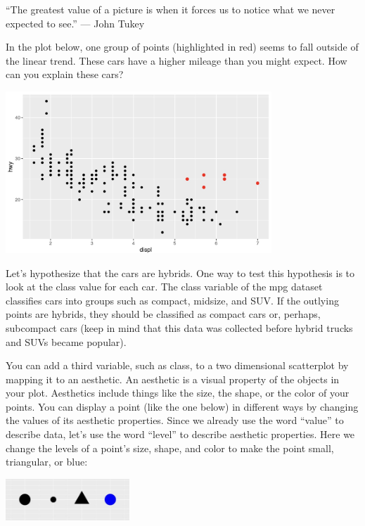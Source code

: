 \documentclass[
  letterpaper,
  DIV=11,
  numbers=noendperiod]{scrreprt}
\begin{document}

``The greatest value of a picture is when it forces us to notice what we
never expected to see.'' --- John Tukey

In the plot below, one group of points (highlighted in red) seems to
fall outside of the linear trend. These cars have a higher mileage than
you might expect. How can you explain these cars?

\includegraphics[width=0.75\textwidth,height=\textheight]{./images/Daily-2-Pic-3.jpg}

Let's hypothesize that the cars are hybrids. One way to test this
hypothesis is to look at the class value for each car. The class
variable of the mpg dataset classifies cars into groups such as compact,
midsize, and SUV. If the outlying points are hybrids, they should be
classified as compact cars or, perhaps, subcompact cars (keep in mind
that this data was collected before hybrid trucks and SUVs became
popular).

You can add a third variable, such as class, to a two dimensional
scatterplot by mapping it to an aesthetic. An aesthetic is a visual
property of the objects in your plot. Aesthetics include things like the
size, the shape, or the color of your points. You can display a point
(like the one below) in different ways by changing the values of its
aesthetic properties. Since we already use the word ``value'' to
describe data, let's use the word ``level'' to describe aesthetic
properties. Here we change the levels of a point's size, shape, and
color to make the point small, triangular, or blue:

\includegraphics[width=0.35\textwidth,height=\textheight]{./images/Daily-2-Pic-4.jpg}
\end{document}
